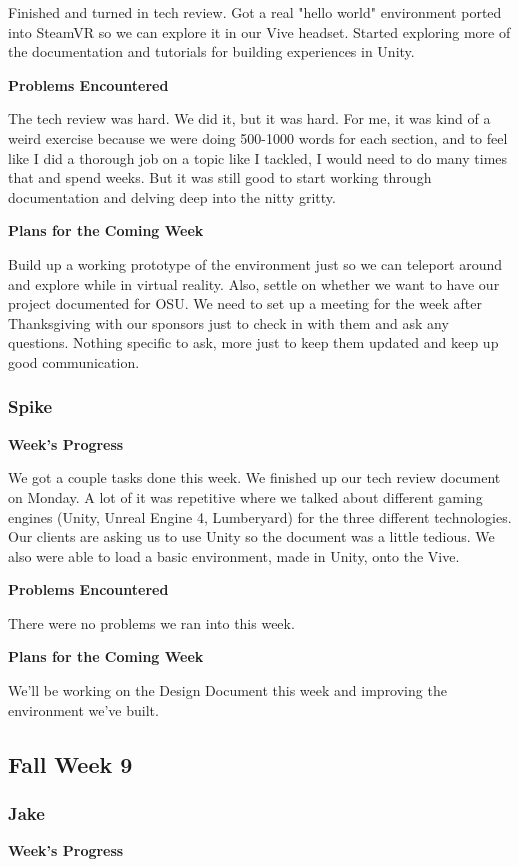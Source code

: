 \documentclass[10pt,journal,compsoc,onecolumn, draftclsnofoot]{IEEEtran}
\begin{document}
Finished and turned in tech review.  Got a real "hello world" environment ported into SteamVR so we can explore it in our Vive headset.  Started exploring more of the documentation and tutorials for building experiences in Unity.

\noindent \textbf{Problems Encountered}

The tech review was hard.  We did it, but it was hard.  For me, it was kind of a weird exercise because we were doing 500-1000 words for each section, and to feel like I did a thorough job on a topic like I tackled, I would need to do many times that and spend weeks.  But it was still good to start working through documentation and delving deep into the nitty gritty.

\noindent \textbf{Plans for the Coming Week}

Build up a working prototype of the environment just so we can teleport around and explore while in virtual reality. Also, settle on whether we want to have our project documented for OSU.  We need to set up a meeting for the week after Thanksgiving with our sponsors just to check in with them and ask any questions.  Nothing specific to ask, more just to keep them updated and keep up good communication.

\subsubsection{Spike}
\noindent \textbf{Week's Progress}

We got a couple tasks done this week. We finished up our tech review document on Monday. A lot of it was repetitive where we talked about different gaming engines (Unity, Unreal Engine 4, Lumberyard) for the three different technologies. Our clients are asking us to use Unity so the document was a little tedious. We also were able to load a basic environment, made in Unity, onto the Vive.

\noindent \textbf{Problems Encountered}

There were no problems we ran into this week.

\noindent \textbf{Plans for the Coming Week}

We'll be working on the Design Document this week and improving the environment we've built.

\subsection{Fall Week 9}
\subsubsection{Jake}
\noindent \textbf{Week's Progress}
\end{document}
